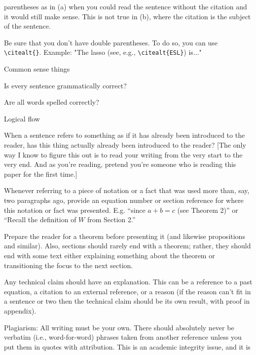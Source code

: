 \documentclass[11pt]{article}
\begin{document}
\begin{todolist}
\begin{todolist}
    parentheses as in (a) when you could read the sentence without the
    citation and it would still make sense.  This is not true in (b),
    where the citation is the subject of the sentence.
\item Be sure that you don't have double parentheses.  To do so, you can use
    \verb+\citealt{}+.  Example: "The lasso (see, e.g., \verb+\citealt{ESL}+) is..."
  \end{todolist}
\item Common sense things
  \begin{todolist}
\item Is every sentence grammatically correct?
\item Are all words spelled correctly?
  \end{todolist}
\item Logical flow
  \begin{todolist}
    \item When a sentence refers to something as if it has already been introduced to the reader, has this thing actually already been introduced to the reader? [The only way I know to figure this out is to read your writing from the very start to the very end.  And as you're reading, pretend you're someone who is reading this paper for the first time.]
\item Whenever referring to a piece of notation or a fact that was used more than, say, two paragraphs ago, provide an equation number or section reference for where this notation or fact was presented.  E.g. ``since $a+b=c$ (see Theorem 2)'' or ``Recall the definition of $W$ from Section 2.''
\item Prepare the reader for a theorem before presenting it (and likewise propositions and similar).  Also, sections should rarely end with a theorem; rather, they should end with some text either explaining something about the theorem or transitioning the focus to the next section.
\item Any technical claim should have an explanation.  This can be a reference to a past equation, a citation to an external reference, or a reason (if the reason can't fit in a sentence or two then the technical claim should be its own result, with proof in appendix).
  \end{todolist}
\item Plagiarism:  All writing must be your own.  There should
  absolutely never be verbatim (i.e., word-for-word) phrases taken
  from another reference unless you put them in quotes with
  attribution.  This is an academic integrity issue, and it is

\end{todolist}
\end{document}
